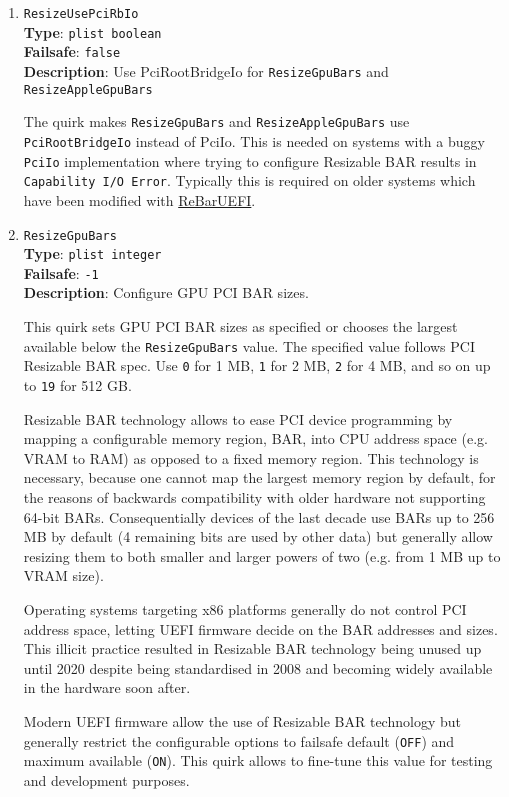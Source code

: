\documentclass[]{article}
\begin{document}
\begin{enumerate}
\item
  \texttt{ResizeUsePciRbIo}\\
  \textbf{Type}: \texttt{plist\ boolean}\\
  \textbf{Failsafe}: \texttt{false}\\
  \textbf{Description}: Use PciRootBridgeIo for \texttt{ResizeGpuBars} and \texttt{ResizeAppleGpuBars}

  The quirk makes \texttt{ResizeGpuBars} and \texttt{ResizeAppleGpuBars} use \texttt{PciRootBridgeIo} instead of PciIo.
  This is needed on systems with a buggy \texttt{PciIo} implementation where trying to configure
  Resizable BAR results in \texttt{Capability I/O Error}. Typically this is required on
  older systems which have been modified with \href{https://github.com/xCuri0/ReBarUEFI}{ReBarUEFI}.

\item
  \texttt{ResizeGpuBars}\\
  \textbf{Type}: \texttt{plist\ integer}\\
  \textbf{Failsafe}: \texttt{-1}\\
  \textbf{Description}: Configure GPU PCI BAR sizes.

  This quirk sets GPU PCI BAR sizes as specified or chooses
  the largest available below the \texttt{ResizeGpuBars} value.
  The specified value follows PCI Resizable BAR spec.
  Use \texttt{0} for 1 MB, \texttt{1} for 2 MB, \texttt{2}
  for 4 MB, and so on up to \texttt{19} for 512 GB.

  Resizable BAR technology allows to ease PCI device programming by mapping
  a configurable memory region, BAR, into CPU address space (e.g. VRAM to RAM)
  as opposed to a fixed memory region. This technology is necessary, because
  one cannot map the largest memory region by default, for the reasons of backwards
  compatibility with older hardware not supporting 64-bit BARs. Consequentially
  devices of the last decade use BARs up to 256 MB by default (4 remaining bits are used
  by other data) but generally allow resizing them to both smaller and larger
  powers of two (e.g. from 1 MB up to VRAM size).

  Operating systems targeting x86 platforms generally do not control PCI address space,
  letting UEFI firmware decide on the BAR addresses and sizes. This illicit practice
  resulted in Resizable BAR technology being unused up until 2020 despite being
  standardised in 2008 and becoming widely available in the hardware soon after.

  Modern UEFI firmware allow the use of Resizable BAR technology but generally
  restrict the configurable options to failsafe default (\texttt{OFF})
  and maximum available (\texttt{ON}). This quirk allows to fine-tune this
  value for testing and development purposes.


\end{enumerate}
\end{document}

